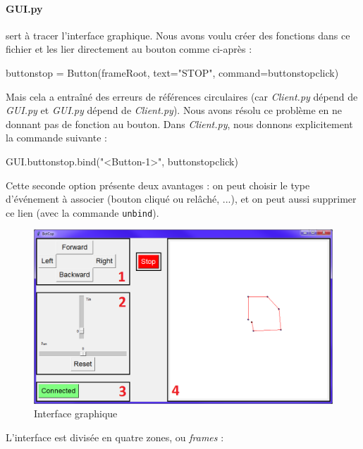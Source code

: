 \documentclass[12pt,a4paper]{report}
\begin{document}
\paragraph{GUI.py} sert à tracer l'interface graphique. Nous avons voulu créer des fonctions dans ce fichier et les lier directement au bouton comme ci-après :

\begin{verbatimtab}[3]
buttonstop = Button(frameRoot, text="STOP", command=buttonstopclick)
\end{verbatimtab}

Mais cela a entraîné des erreurs de références circulaires (car \textit{Client.py} dépend de \textit{GUI.py} et \textit{GUI.py} dépend de \textit{Client.py}). Nous avons résolu ce problème en ne donnant pas de fonction au bouton. Dans \textit{Client.py}, nous donnons explicitement la commande suivante :

\begin{verbatimtab}[3]
GUI.buttonstop.bind("<Button-1>", buttonstopclick)
\end{verbatimtab}

Cette seconde option présente deux avantages : on peut choisir le type d'événement à associer (bouton cliqué ou relâché, ...), et on peut aussi supprimer ce lien (avec la commande \verb=unbind=).

\begin{figure}[hf!]
\center
\includegraphics[scale=0.5]{images/Screen/Client2.png}
\caption{Interface graphique}
\end{figure}

L'interface est divisée en quatre zones, ou \textit{frames} :
\end{document}
